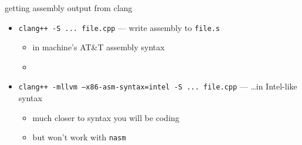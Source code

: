 \begin{frame}{getting assembly output from clang}
    \begin{itemize}
        \item \texttt{clang++ -S ... file.cpp} --- write assembly to \texttt{file.s}
            \begin{itemize}
            \item in machine's AT\&T assembly syntax
            \item {}
            \end{itemize}
        \item \texttt{clang++ -mllvm --x86-asm-syntax=intel -S ... file.cpp} --- \ldots in Intel-like syntax
            \begin{itemize}
            \item much closer to syntax you will be coding
            \item but won't work with \texttt{nasm}
            \end{itemize}
    \end{itemize}
\end{frame}
